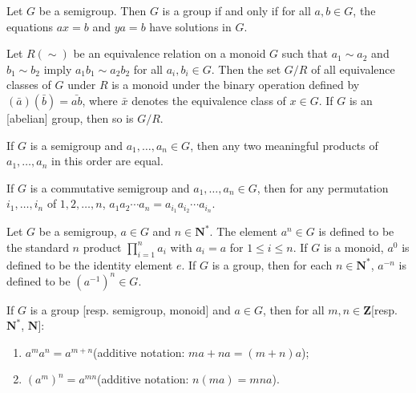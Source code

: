 \begin{proposition}
    Let $G$ be a semigroup. Then $G$ is a group if and only if for all $a,b\in G$, the equations $ax=b$ and $ya=b$ have solutions in $G$.
\end{proposition}

\begin{theorem}
    Let $R(\sim)$ be an equivalence relation on a monoid $G$ such that $a_{1}\sim a_{2}$ and $b_{1}\sim b_{2}$ imply $a_{1}b_{1}\sim a_{2}b_{2}$ for all $a_{i},b_{i}\in G$. Then the set $G /R$ of all equivalence classes of $G$ under $R$ is a monoid under the binary operation defined by $(\bar{a})(\bar{b})=\bar{ab}$, where $\bar{x}$ denotes the equivalence class of $x\in G$. If $G$ is an [abelian] group, then so is $G /R$.
\end{theorem}

\begin{theorem}
    If $G$ is a semigroup and $a_{1},\dots,a_{n}\in G$, then any two meaningful products of $a_{1},\dots,a_{n}$ in this order are equal.
\end{theorem}

\begin{corollary}
    If $G$ is a commutative semigroup and $a_{1},\dots,a_{n}\in G$, then for any permutation $i_{1},\dots,i_{n}$ of $1,2,\dots,n$, $a_{1}a_{2}\cdots a_{n}=a_{i_{1}}a_{i_{2}}\cdots a_{i_{n}}$.
\end{corollary}

\begin{definition}
    Let $G$ be a semigroup, $a\in G$ and $n\in \mathbf{N}^{*}$. The element $a^{n}\in G$ is defined to be the standard $n$ product $\prod_{i=1}^{n}a_{i}$ with $a_{i}=a$ for $1\leq i\leq n$. If $G$ is a monoid, $a^{0}$ is defined to be the identity element $e$. If $G$ is a group, then for each $n\in \mathbf{N}^{*}$, $a^{-n}$ is defined to be $(a^{-1})^{n}\in G$.
\end{definition}

\begin{theorem}
    If $G$ is a group [resp. semigroup, monoid] and $a\in G$, then for all $m,n\in\mathbf{Z}$[resp. $\mathbf{N}^{*}$, $\mathbf{N}$]:
    \begin{enumerate}[i]
        \item $a^{m}a^{n}=a^{m+n}$(additive notation: $ma+na=(m+n)a$);
        \item $(a^{m})^{n}=a^{mn}$(additive notation: $n(ma)=mna$).
    \end{enumerate}
\end{theorem}